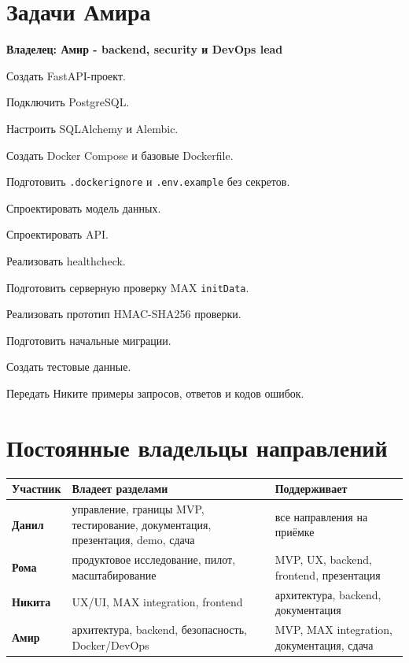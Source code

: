 \documentclass[11pt,a4paper]{article}
\newcommand{\code}[1]{\texttt{#1}}
\newcommand{\owner}[1]{\textcolor{MaxPurple}{\textbf{Владелец: #1}}}
\begin{document}
\section{Задачи Амира}
\owner{Амир - backend, security и DevOps lead}
\begin{tasklist}
  \item Создать FastAPI-проект.
  \item Подключить PostgreSQL.
  \item Настроить SQLAlchemy и Alembic.
  \item Создать Docker Compose и базовые Dockerfile.
  \item Подготовить \code{.dockerignore} и \code{.env.example} без секретов.
  \item Спроектировать модель данных.
  \item Спроектировать API.
  \item Реализовать healthcheck.
  \item Подготовить серверную проверку MAX \code{initData}.
  \item Реализовать прототип HMAC-SHA256 проверки.
  \item Подготовить начальные миграции.
  \item Создать тестовые данные.
  \item Передать Никите примеры запросов, ответов и кодов ошибок.
\end{tasklist}

\section{Постоянные владельцы направлений}
\begin{tabularx}{\textwidth}{>{\bfseries}p{25mm}X X}\toprule
Участник & Владеет разделами & Поддерживает\\\midrule
Данил & управление, границы MVP, тестирование, документация, презентация, demo, сдача & все направления на приёмке\\
Рома & продуктовое исследование, пилот, масштабирование & MVP, UX, backend, frontend, презентация\\
Никита & UX/UI, MAX integration, frontend & архитектура, backend, документация\\
Амир & архитектура, backend, безопасность, Docker/DevOps & MVP, MAX integration, документация, сдача\\\bottomrule
\end{tabularx}
\end{document}
